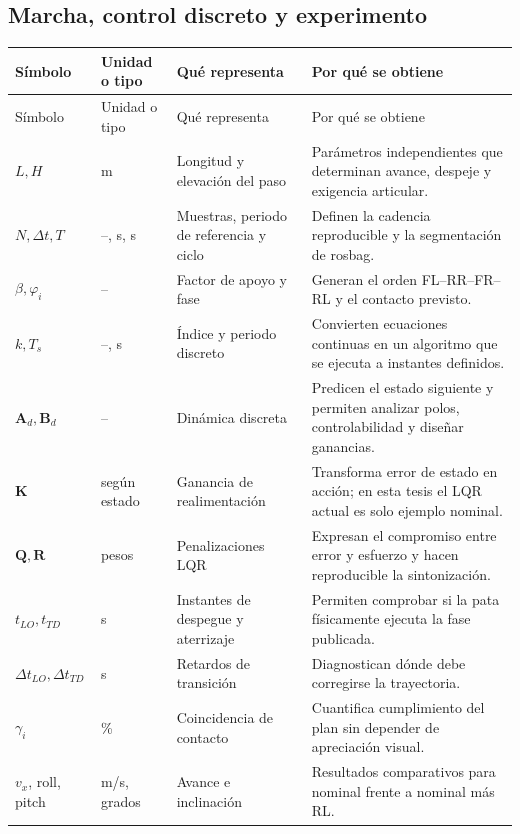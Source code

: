 \documentclass[11pt,letterpaper]{article}
\newcommand{\mat}[1]{\bm{#1}}
\begin{document}
\subsection{Marcha, control discreto y experimento}
\footnotesize
\begin{longtable}{p{2.2cm}p{1.7cm}p{3.9cm}p{5.5cm}}
\toprule Símbolo&Unidad o tipo&Qué representa&Por qué se obtiene\\\midrule\endfirsthead
\toprule Símbolo&Unidad o tipo&Qué representa&Por qué se obtiene\\\midrule\endhead
$L,H$&m&Longitud y elevación del paso&Parámetros independientes que determinan
avance, despeje y exigencia articular.\\
$N,\Delta t,T$&--, s, s&Muestras, periodo de referencia y ciclo&Definen la
cadencia reproducible y la segmentación de rosbag.\\
$\beta,\varphi_i$&--&Factor de apoyo y fase&Generan el orden FL--RR--FR--RL y el
contacto previsto.\\
$k,T_s$&--, s&Índice y periodo discreto&Convierten ecuaciones continuas en un
algoritmo que se ejecuta a instantes definidos.\\
$\mat A_d,\mat B_d$&--&Dinámica discreta&Predicen el estado siguiente y permiten
analizar polos, controlabilidad y diseñar ganancias.\\
$\mat K$&según estado&Ganancia de realimentación&Transforma error de estado en
acción; en esta tesis el LQR actual es solo ejemplo nominal.\\
$\mat Q,\mat R$&pesos&Penalizaciones LQR&Expresan el compromiso entre error y
esfuerzo y hacen reproducible la sintonización.\\
$t_{LO},t_{TD}$&s&Instantes de despegue y aterrizaje&Permiten comprobar si la
pata físicamente ejecuta la fase publicada.\\
$\Delta t_{LO},\Delta t_{TD}$&s&Retardos de transición&Diagnostican dónde debe
corregirse la trayectoria.\\
$\gamma_i$&\%&Coincidencia de contacto&Cuantifica cumplimiento del plan sin
depender de apreciación visual.\\
$v_x$, roll, pitch&m/s, grados&Avance e inclinación&Resultados comparativos para
nominal frente a nominal más RL.\\
\bottomrule
\end{longtable}
\normalsize
\end{document}
